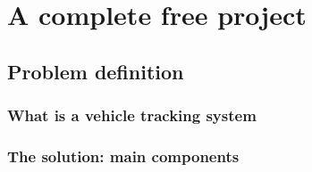 
\chapter{A complete free project}

\section{Problem definition}
\label{problem}

\subsection{What is a vehicle tracking system}

\subsection{The solution: main components}
